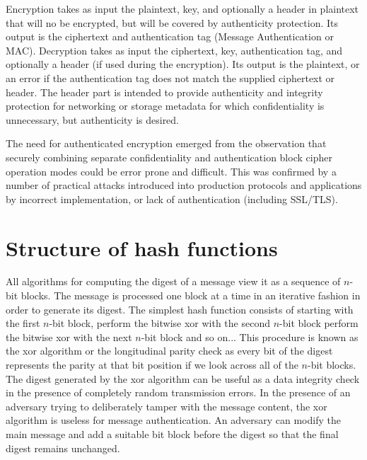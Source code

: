 Encryption takes as input the plaintext, key, and optionally a header in plaintext that will no be encrypted, but will be covered by authenticity protection. Its output is the ciphertext and authentication tag (Message Authentication or MAC).
Decryption takes as input the ciphertext, key, authentication tag, and optionally a header (if used during the encryption). Its output is the plaintext, or an error if the authentication tag does not match the supplied ciphertext or header.
The header part is intended to provide authenticity and integrity protection for networking or storage metadata for which confidentiality is unnecessary, but authenticity is desired.

The need for authenticated encryption emerged from the observation that securely combining separate confidentiality and authentication block cipher operation modes could be error prone and difficult.
This was confirmed by a number of practical attacks introduced into production protocols and applications by incorrect implementation, or lack of authentication (including SSL/TLS).

\section{Structure of hash functions}

All algorithms for computing the digest of a message view it as a sequence of $n$-bit blocks. The message is processed one block at a time in an iterative fashion in order to generate its digest. The simplest hash function consists of starting with the first $n$-bit block, perform the bitwise xor with the second $n$-bit block perform the bitwise xor with the next $n$-bit block and so on... This procedure is known as the xor algorithm or the longitudinal parity check as every bit of the digest represents the parity at that bit position if we look across all of the $n$-bit blocks.
The digest generated by the xor algorithm can be useful as a data integrity check in the presence of completely random transmission errors. In the presence of an adversary trying to deliberately tamper with the message content, the xor algorithm is useless for message authentication. An adversary can modify the main message and add a suitable bit block before the digest so that the final digest remains unchanged.

